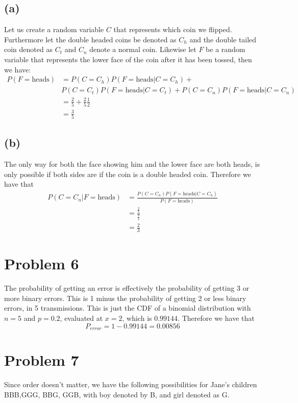 \subsection*{(a)}
Let us create a random variable $C$ that represents which coin we flipped. Furthermore let the double headed coins be denoted as $C_h$ and the double tailed coin denoted as $C_t$
and $C_n$ denote a normal coin. Likewise let $F$ be a random variable that represents the lower face of the coin after it has been tossed, then we have:
\begin{align*}
    P(F=\text{heads})&=P(C=C_h)P(F=\text{heads}|C=C_h)+\\&P(C=C_t)P(F=\text{heads}|C=C_t)+P(C=C_n)P(F=\text{heads}|C=C_n)\\
    &=\frac{2}{5}+\frac{2}{5}\frac{1}{2}\\
    &=\boxed{\frac{3}{5}}
\end{align*}
\subsection*{(b)}
The only way for both the face showing him and the lower face are both heads, is only possible if both 
sides are if the coin is a double headed coin. Therefore we have that
\begin{align*}
    P(C=C_n|F=\text{heads})&=\frac{P(C=C_n)P(F=\text{heads}|C=C_n)}{P(F=\text{heads})}\\
    &=\frac{\frac{2}{5}}{\frac{3}{5}}\\
    &=\boxed{\frac{2}{3}}
\end{align*}
\section*{Problem 6}
The probability of getting an error is effectively the probability of getting 
3 or more binary errors. This is 1 minus the probability of getting 2 or less binary errors, in 5 transmissions. 
This is just the CDF of a binomial distribution with $n=5$ and $p=0.2$, evaluated at $x=2$, which is $0.99144$. Therefore we have that
$$P_{error}=1-0.99144=\boxed{0.00856}$$
\section*{Problem 7}
Since order doesn't matter, we have the following possibilities for Jane's children
BBB,GGG, BBG, GGB, with boy denoted by B, and girl denoted as G. 


